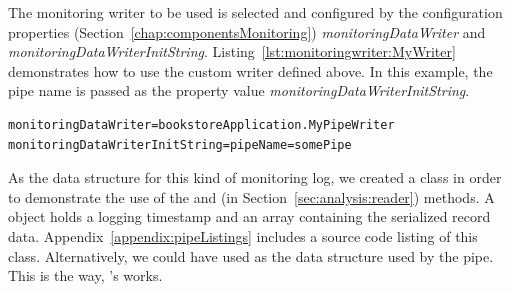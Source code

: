 \setJavaCodeListing


\noindent The monitoring writer to be used is selected and configured by the \KiekerMonitoringPart{} %
configuration properties (Section~\ref{chap:componentsMonitoring}) %
\textit{monitoringDataWriter} and \textit{monitoringDataWriterInitString}. %
Listing~\ref{lst:monitoringwriter:MyWriter} demonstrates how to use the custom %
writer  defined above. In this example, the pipe name is %
passed as the property value \textit{monitoringDataWriterInitString}.

\setBashListing       
\begin{lstlisting}[label=lst:monitoringwriter:MyWriter]
monitoringDataWriter=bookstoreApplication.MyPipeWriter
monitoringDataWriterInitString=pipeName=somePipe
\end{lstlisting}

\enlargethispage{1cm}

\noindent As the data structure for this kind of monitoring log, we created a %
class  in order to demonstrate the use of the  and %
 (in Section~\ref{sec:analysis:reader}) methods. %
A  object holds a logging timestamp and an  array %
containing the serialized record data. %
Appendix~\ref{appendix:pipeListings} includes a source code listing of this class. %
Alternatively, we could have used  as the data structure %
used by the pipe. This is the way, \Kieker{}'s  works. %
